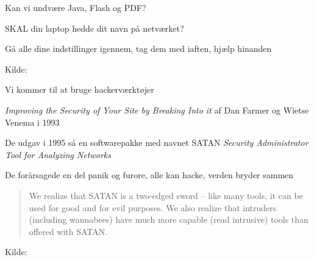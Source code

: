 \documentclass[20pt,landscape,a4paper,footrule]{foils}
\begin{document}

\vskip 1cm
\centerline{Kan vi undvære Java, Flash og PDF?}

\begin{list1}
\item SKAL din laptop hedde dit navn på netværket?
\begin{list2}
\item Gå alle dine indstillinger igennem, tag dem med iaften, hjælp hinanden
\end{list2}
\end{list1}

Kilde: 














Vi kommer til at bruge hackerværktøjer
\begin{list1}
\item \emph{Improving the Security of Your Site by Breaking Into it} af
Dan Farmer og Wietse Venema i 1993
\item De udgav i 1995 så en softwarepakke med navnet SATAN
\emph{Security Administrator Tool for Analyzing Networks}
\item De forårsagede en del panik og furore, alle kan hacke, verden bryder sammen

\vskip 1cm
\begin{quote}
We realize that SATAN is a two-edged sword -- like
many tools, it can be used for good and for evil
purposes. We also realize that intruders (including
wannabees) have much more capable (read intrusive)
tools than offered with SATAN.
\end{quote}
\end{list1}

\vskip 1cm
Kilde:


\end{document}

